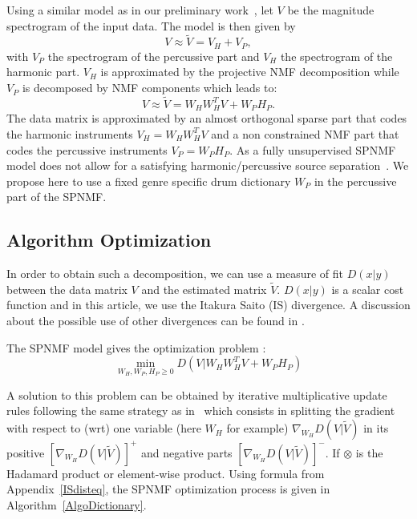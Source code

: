 \documentclass{article}
\begin{document}
Using a similar model as in our preliminary work~\cite{laroche2015structuredhidden}, let $V$ be the magnitude spectrogram of the input data. The model is then given by
\begin{equation} \label{Cfunction}
V \approx \tilde{V}= V_H + V_{P},
\end{equation}
with $V_P$ the spectrogram of the percussive part and $V_H$ the spectrogram of the harmonic part. $V_H$ is approximated by the projective NMF decomposition \cite{yuanOja2005} while $V_P$ is decomposed by NMF components which leads to:
\begin{equation}
V \approx \tilde{V}= W_{H}W_{H}^{T}V + W_{P} H_{P}.
\end{equation}
The data matrix is approximated by an almost orthogonal sparse part that codes the harmonic instruments $V_H = W_HW_H^T V$ and a non constrained NMF part that codes the percussive instruments $V_P = W_PH_P$. As a fully unsupervised SPNMF model does not allow for a satisfying harmonic/percussive source separation~\cite{laroche2015structuredhidden}. We propose here to use a fixed genre specific drum dictionary $W_P$ in the percussive part of the SPNMF.



\subsection{Algorithm Optimization}

In order to obtain such a decomposition, we can use a measure of fit $D(x|y)$ between the data matrix $V$ and the estimated matrix $\tilde{V}$. $D(x|y)$ is a scalar cost function and in this article, we use the Itakura Saito (IS) divergence. A discussion about the possible use of other divergences can be found in \cite{larocheJournalhidden}.

The SPNMF model gives the optimization problem : 
\begin{equation}\label{InitCost}
\min_{W_H,W_P,H_P \geq 0} D(V|W_{H}W_{H}^{T}V + W_{P} H_{P})  
\end{equation}

A solution to this problem can be obtained by iterative multiplicative update rules following the same strategy as in~\cite{yuanOja2005,Lee01algorithmsfor} which consists in splitting the gradient with respect to (wrt) one variable (here $W_H$ for example) $\nabla_{W_H} D(V|\tilde{V})$ in its positive $[\nabla_{W_H} D(V|\tilde{V})]^{+}$ and negative parts $[\nabla_{W_H} D(V|\tilde{V})]^{-}$. If $\otimes$ is the Hadamard product or element-wise product. Using formula from Appendix~\ref{ISdisteq}, the SPNMF optimization process is given in Algorithm~\ref{AlgoDictionary}.
 
\end{document}
